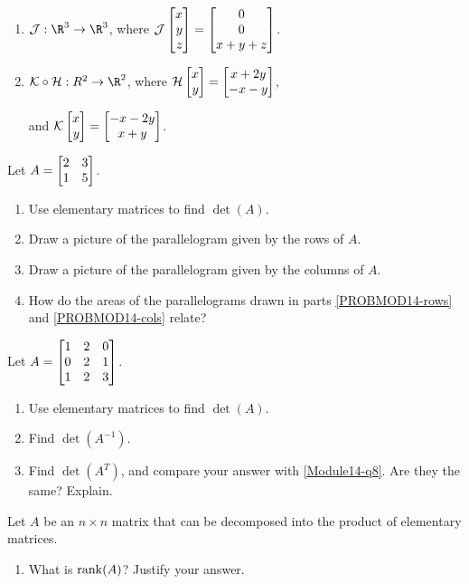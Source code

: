 \begin{exercises}
\begin{problist}
\begin{enumerate}
			\item $\mathcal{J}:\R^{3}\to\R^{3}$, where
				$\mathcal{J}\mat{x\\y\\z}=\matc{0\\0\\x+y+z}$.

			\item $\mathcal{K}\circ \mathcal{H}:R^{2}\to\R^{2}$, where
				$\mathcal{H}\mat{x\\y}=\matc{x+2y\\-x-y}$,

				and $\mathcal{K}\mat{x\\y}=\matc{-x-2y\\x+y}$.
		\end{enumerate}

		\prob Let $A=\mat{2&3\\1&5}$.
		\begin{enumerate}
			\item Use elementary matrices to find $\det(A)$.

			\item Draw a picture of the parallelogram given by the rows of $A$.
				\label{PROBMOD14-rows}

			\item Draw a picture of the parallelogram given by the columns of $A$.
				\label{PROBMOD14-cols}

			\item How do the areas of the parallelograms drawn in parts \ref{PROBMOD14-rows}
				and \ref{PROBMOD14-cols} relate?
		\end{enumerate}

		\prob Let $A=\mat{1&2&0\\0&2&1\\1&2&3}$.
		\begin{enumerate}
			\item \label{Module14-q8} Use elementary matrices to find $\det(A)$.

			\item Find $\det(A^{-1})$.

			\item Find $\det(A^{T})$, and compare your answer with
				\ref{Module14-q8}. Are they the same? Explain.
		\end{enumerate}

		\prob Let $A$ be an $n \times n$ matrix that can be decomposed into the
		product of elementary matrices.
		\begin{enumerate}
			\item What is $\operatorname{rank}(A)$? Justify your answer.


\end{enumerate}
\end{problist}
\end{exercises}

